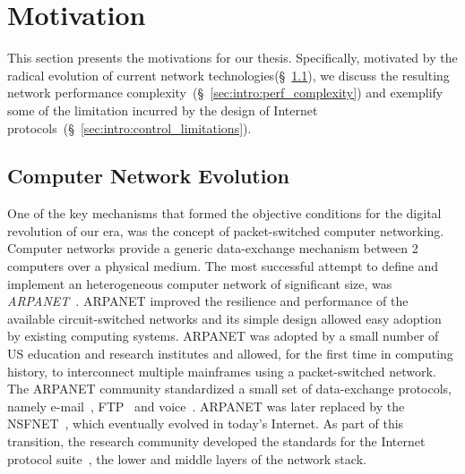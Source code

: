 \section{Motivation} \label{sec:intro:motivations}

This section presents the motivations for our thesis. Specifically, motivated by
the radical evolution of current network
technologies(\S~\ref{sec:intro:net_evolution}), we discuss the resulting network
performance complexity~(\S~\ref{sec:intro:perf_complexity}) and exemplify some
of the limitation incurred by the design of Internet
protocols~(\S~\ref{sec:intro:control_limitations}).

\subsection{Computer Network Evolution} \label{sec:intro:net_evolution}

One of the key mechanisms that formed the objective conditions for the digital
revolution of our era, was the concept of packet-switched computer networking.
Computer networks provide a generic data-exchange mechanism between 2 computers
over a physical medium.  The most successful attempt to define and implement an
heterogeneous computer network of significant size, was
\textit{ARPANET}~. ARPANET improved the resilience and
performance of the available circuit-switched networks and its simple design
allowed easy adoption by existing computing systems.  ARPANET was adopted by a
small number of US education and research institutes and allowed, for the first
time in computing history, to interconnect multiple mainframes using a
packet-switched network. The ARPANET community standardized a small set of
data-exchange protocols, namely e-mail~, FTP~ and
voice~. ARPANET was later replaced by the
NSFNET~, which eventually evolved in today's Internet.  As part
of this transition, the research community developed the standards for the
Internet protocol suite~, the
lower and middle layers of the network stack.

